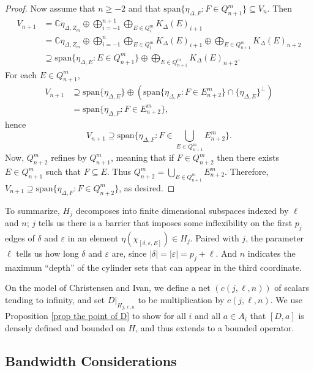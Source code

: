 \documentclass[12pt]{amsart}
\newcommand{\sse}{\subseteq}
\newcommand{\spn}{\text{span}}
\newcommand{\C}{\mathbb{C}}
\newcommand{\De}{\Delta}
\newcommand{\ep}{\varepsilon}
\theoremstyle{plain} %
\theoremstyle{definition} %
\begin{document}
\begin{proof}
    Now assume that $n \ge -2$ and that $\spn\{\eta_{\De, F} : F \in Q^m_{n+1} \} \sse V_n$. Then
    \begin{align*}
        V_{n+1} &= \C \eta_{\De, Z_m} \oplus \bigoplus_{i=-1}^{n+1} \bigoplus_{E \in Q_i^m} K_{\De}(E)_{i+1}\\
        &= \C \eta_{\De, Z_m} \oplus \bigoplus_{i=-1}^n \bigoplus_{E \in Q_i^m} K_{\De}(E)_{i+1} \oplus \bigoplus_{E \in Q_{n+1}^m} K_{\De}(E)_{n+2}\\
        &\supseteq \spn\{\eta_{\De,E} : E \in Q_{n+1}^m\} \oplus \bigoplus_{E \in Q_{n+1}^m} K_{\De}(E)_{n+2}.
    \end{align*}
    For each $E \in Q_{n+1}^m$, 
    \begin{align*}
        V_{n+1} &\supseteq \spn \{ \eta_{\De, E} \} \oplus \left( \spn \{ \eta_{\De,F} : F \in E_{n+2}^m \} \cap \{ \eta_{\De,E} \}^{\perp} \right)\\
        &= \spn\{\eta_{\De,F} : F \in E_{n+2}^m\},
    \end{align*}
    hence $$V_{n+1} \supseteq \spn\{ \eta_{\De,F} : F \in \bigcup_{E \in Q_{n+1}^m} E_{n+2}^m \}.$$
    Now, $Q_{n+2}^m$ refines by $Q_{n+1}^m$, meaning that if $F \in Q_{n+2}^m$ then there exists $E \in Q_{n+1}^m$ such that $F \sse E$. Thus $Q_{n+2}^m = \bigcup_{E \in Q_{n+1}^m} E_{n+2}^m$. Therefore, $V_{n+1} \supseteq \spn\{\eta_{\De,F} : F \in Q_{n+2}^m\}$, as desired.
\end{proof}


To summarize, $H_j$ decomposes into finite dimensional subspaces indexed by $\ell$ and $n$; 
$j$ tells us there is a barrier that imposes some inflexibility on the first $p_j$ edges of $\delta$ and $\ep$ in an element $\eta(\chi_{[\delta, \ep, E]}) \in H_j$.
Paired with $j$, the parameter $\ell$ tells us how long $\delta$ and $\ep$ are, since $|\delta| = |\ep| = p_j + \ell$. And $n$ indicates the maximum ``depth'' of the cylinder sets that can appear in the third coordinate. 

On the model of Christensen and Ivan, we define a net $(c(j,\ell,n))$ of scalars tending to infinity, and set $D|_{H_{j,\ell,n}}$ to be multiplication by $c(j,\ell,n)$. We use Proposition \ref{prop the point of D} to show for all $i$ and all $a \in A_i$ that $[D,a]$ is densely defined and bounded on $H$, and thus extends to a bounded operator.






\subsection{Bandwidth Considerations}
\end{document}
